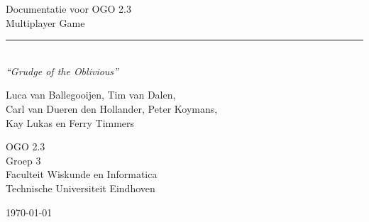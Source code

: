 \begin{titlepage}
	\begin{center}
		
		{\Huge Documentatie voor OGO 2.3\\ Multiplayer Game}\\[0.5cm]
		\rule{\linewidth}{0.5mm}\\[0.5cm]
				\bigskip
		\huge \textit{``Grudge of the Oblivious''}
		
		{\Large
		Luca van Ballegooijen, Tim van Dalen, \\
		Carl van Dueren den Hollander, Peter Koymans,\\
		Kay Lukas en Ferry Timmers\\[1cm]
		}
		
		{\large
		OGO 2.3\\
		Groep 3 \\[1cm]
		Faculteit Wiskunde en Informatica\\
		Technische Universiteit Eindhoven\\[1cm]
		}
		
		

		\vfill

		{\large \today}
	\end{center}
\end{titlepage}
